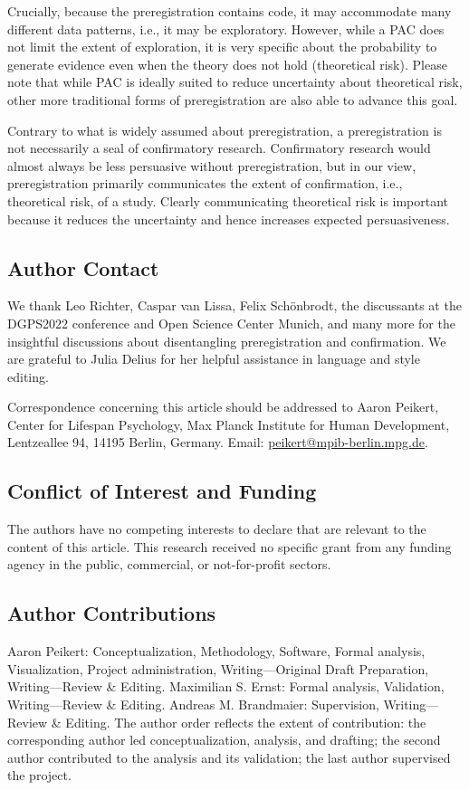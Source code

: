 \documentclass[jou,a4paper]{apa7}
\begin{document}
Crucially, because the preregistration contains code, it may accommodate many different data patterns, i.e., it may be exploratory.
However, while a PAC does not limit the extent of exploration, it is very specific about the probability to generate evidence even when the theory does not hold (theoretical risk).
Please note that while PAC is ideally suited to reduce uncertainty about theoretical risk, other more traditional forms of preregistration are also able to advance this goal.\par
Contrary to what is widely assumed about preregistration, a preregistration is not necessarily a seal of confirmatory research.
Confirmatory research would almost always be less persuasive without preregistration, but in our view, preregistration primarily communicates the extent of confirmation, i.e., theoretical risk, of a study.
Clearly communicating theoretical risk is important because it reduces the uncertainty and hence increases expected persuasiveness.


\subsection{Author Contact}
We thank Leo Richter, Caspar van Lissa, Felix Schönbrodt, the discussants at the DGPS2022 conference and Open Science Center Munich, and many more for the insightful discussions about disentangling preregistration and confirmation. We are grateful to Julia Delius for her helpful assistance in language and style editing.

Correspondence concerning this article should be addressed to Aaron Peikert, Center for Lifespan Psychology, Max Planck Institute for Human Development, Lentzeallee 94, 14195 Berlin, Germany. Email: \href{mailto:peikert@mpib-berlin.mpg.de}{peikert@mpib-berlin.mpg.de}.


\subsection{Conflict of Interest and Funding}
The authors have no competing interests to declare that are relevant to the content of this article. This research received no specific grant from any funding agency in the public, commercial, or not-for-profit sectors.

\subsection{Author Contributions}
Aaron Peikert: Conceptualization, Methodology, Software, Formal analysis, Visualization, Project administration, Writing---Original Draft Preparation, Writing---Review \& Editing. Maximilian S. Ernst: Formal analysis, Validation, Writing---Review \& Editing. Andreas M. Brandmaier: Supervision, Writing---Review \& Editing. The author order reflects the extent of contribution: the corresponding author led conceptualization, analysis, and drafting; the second author contributed to the analysis and its validation; the last author supervised the project.
\end{document}
